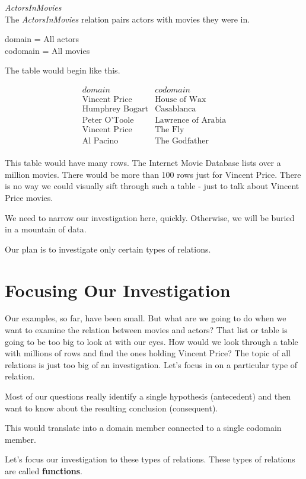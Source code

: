 \documentclass{ximera}
\begin{document}
\begin{example} \textit{ActorsInMovies} \\
The \textit{ActorsInMovies} relation pairs actors with movies they were in.

domain = All actors \\
codomain = All movies

The table would begin like this.

\[
\begin{array}{l|l}
    domain      & codomain      \\ \hline
    \text{Vincent Price}   &  \text{House of Wax} \\
    \text{Humphrey Bogart}   & \text{Casablanca} \\
    \text{Peter O'Toole}  &  \text{Lawrence of Arabia} \\
    \text{Vincent Price}  &  \text{The Fly} \\
    \text{Al Pacino} &  \text{The Godfather} \\ 
\end{array}
\]

\end{example} 


This table would have many rows. The Internet Movie Database lists over a million movies.  There would be more than 100 rows just for Vincent Price. There is no way we could visually sift through such a table - just to talk about Vincent Price movies.

We need to narrow our investigation here, quickly. Otherwise, we will be buried in a mountain of data.

Our plan is to investigate only certain types of relations.








\section{Focusing Our Investigation}


Our examples, so far, have been small.  But what are we going to do when we want to examine the relation between movies and actors?  That list or table is going to be too big to look at with our eyes.  How would we look through a table with millions of rows and find the ones holding Vincent Price?  The topic of all relations is just too big of an investigation. Let's focus in on a particular type of relation.

Most of our questions really identify a single hypothesis (antecedent) and then want to know about the resulting conclusion (consequent).

This would translate into a domain member connected to a single codomain member.

Let's focus our investigation to these types of relations.  These types of relations are called \textbf{functions}.
\end{document}
